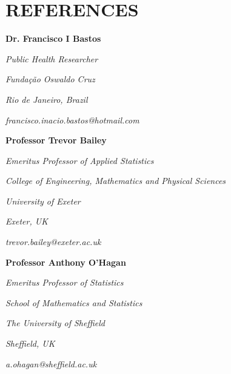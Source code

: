 \documentclass[paper=a4,fontsize=11pt]{scrartcl}	 			%
\newcommand{\NewPart}[1]{\section*{\uppercase{#1}}}
\newcommand{\EducationEntry}[4]{
		\noindent \textbf{#1} \hfill 					%
		\colorbox{White}{%
			\parbox{10em}{%
			\hfill\color{Black}#2}} \par				%
		\noindent \textit{#3} \par					%
		\noindent\hangindent=2em\hangafter=0 \small #4 	%
		\normalsize \par}
\newcommand{\RefEntry}[7]{						%
		\noindent \textbf{#1} \par 					%
		\noindent \textit{#2} \par	%
		\noindent \textit{#3} \par
		\noindent \textit{#4} \par%
		\noindent \textit{#5} \par
		\noindent \textit{#6} \par
		\noindent \textit{#7} \par}
\begin{document}


\NewPart{References}


\RefEntry{Dr. Francisco I Bastos}
{Public Health Researcher}
{Funda\c{c}\~ao Oswaldo Cruz}
{Rio de Janeiro, Brazil}
{francisco.inacio.bastos@hotmail.com}
{}
{}
{}



\RefEntry{Professor Trevor Bailey}
{Emeritus Professor of Applied Statistics}
{College of Engineering, Mathematics and Physical Sciences}
{University of Exeter}
{Exeter, UK}
{trevor.bailey@exeter.ac.uk}
{}
{}

\RefEntry{Professor Anthony O'Hagan}
{Emeritus Professor of Statistics}
{School of Mathematics and Statistics}
{The University of Sheffield}
{Sheffield, UK}
{a.ohagan@sheffield.ac.uk}
{}
{}
\end{document}
